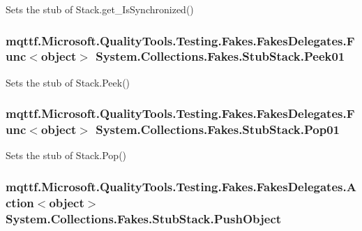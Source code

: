Sets the stub of Stack.\-get\-\_\-\-Is\-Synchronized()

\hypertarget{class_system_1_1_collections_1_1_fakes_1_1_stub_stack_a12331080b5982d9da99beef048e7e0dd}{
\subsubsection[{Peek01}]{\setlength{\rightskip}{0pt plus 5cm}mqttf.\-Microsoft.\-Quality\-Tools.\-Testing.\-Fakes.\-Fakes\-Delegates.\-Func$<$object$>$ System.\-Collections.\-Fakes.\-Stub\-Stack.\-Peek01}}\label{class_system_1_1_collections_1_1_fakes_1_1_stub_stack_a12331080b5982d9da99beef048e7e0dd}


Sets the stub of Stack.\-Peek()

\hypertarget{class_system_1_1_collections_1_1_fakes_1_1_stub_stack_a4d43fd587030b4868c87efc9520e82d5}{
\subsubsection[{Pop01}]{\setlength{\rightskip}{0pt plus 5cm}mqttf.\-Microsoft.\-Quality\-Tools.\-Testing.\-Fakes.\-Fakes\-Delegates.\-Func$<$object$>$ System.\-Collections.\-Fakes.\-Stub\-Stack.\-Pop01}}\label{class_system_1_1_collections_1_1_fakes_1_1_stub_stack_a4d43fd587030b4868c87efc9520e82d5}


Sets the stub of Stack.\-Pop()

\hypertarget{class_system_1_1_collections_1_1_fakes_1_1_stub_stack_aa415d19c5175c5ea2928d565d5c0005d}{
\subsubsection[{Push\-Object}]{\setlength{\rightskip}{0pt plus 5cm}mqttf.\-Microsoft.\-Quality\-Tools.\-Testing.\-Fakes.\-Fakes\-Delegates.\-Action$<$object$>$ System.\-Collections.\-Fakes.\-Stub\-Stack.\-Push\-Object}}\label{class_system_1_1_collections_1_1_fakes_1_1_stub_stack_aa415d19c5175c5ea2928d565d5c0005d}



